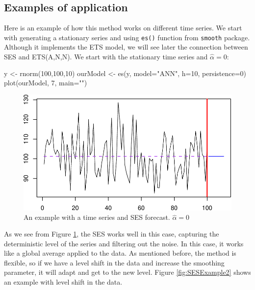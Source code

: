 \documentclass[
]{book}
\newenvironment{Shaded}{\begin{snugshade}}{\end{snugshade}}
\newcommand{\AttributeTok}[1]{\textcolor[rgb]{0.77,0.63,0.00}{#1}}
\newcommand{\DecValTok}[1]{\textcolor[rgb]{0.00,0.00,0.81}{#1}}
\newcommand{\FunctionTok}[1]{\textcolor[rgb]{0.00,0.00,0.00}{#1}}
\newcommand{\NormalTok}[1]{#1}
\newcommand{\OtherTok}[1]{\textcolor[rgb]{0.56,0.35,0.01}{#1}}
\newcommand{\StringTok}[1]{\textcolor[rgb]{0.31,0.60,0.02}{#1}}
\theoremstyle{definition}
\theoremstyle{definition}
\theoremstyle{definition}
\theoremstyle{definition}
\theoremstyle{remark}
\begin{document}
\hypertarget{examples-of-application}{%
\subsection{Examples of application}\label{examples-of-application}}

Here is an example of how this method works on different time series. We start with generating a stationary series and using \texttt{es()} function from \texttt{smooth} package. Although it implements the ETS model, we will see later the connection between SES and ETS(A,N,N). We start with the stationary time series and \(\hat{\alpha}=0\):

\begin{Shaded}
\begin{Highlighting}[]
\NormalTok{y }\OtherTok{\textless{}{-}} \FunctionTok{rnorm}\NormalTok{(}\DecValTok{100}\NormalTok{,}\DecValTok{100}\NormalTok{,}\DecValTok{10}\NormalTok{)}
\NormalTok{ourModel }\OtherTok{\textless{}{-}} \FunctionTok{es}\NormalTok{(y, }\AttributeTok{model=}\StringTok{"ANN"}\NormalTok{, }\AttributeTok{h=}\DecValTok{10}\NormalTok{, }\AttributeTok{persistence=}\DecValTok{0}\NormalTok{)}
\FunctionTok{plot}\NormalTok{(ourModel, }\DecValTok{7}\NormalTok{, }\AttributeTok{main=}\StringTok{""}\NormalTok{)}
\end{Highlighting}
\end{Shaded}

\begin{figure}
\centering
\includegraphics{adam_files/figure-latex/SESExample1-1.pdf}
\caption{\label{fig:SESExample1}An example with a time series and SES forecast. \(\hat{\alpha}=0\)}
\end{figure}

As we see from Figure \ref{fig:SESExample1}, the SES works well in this case, capturing the deterministic level of the series and filtering out the noise. In this case, it works like a global average applied to the data. As mentioned before, the method is flexible, so if we have a level shift in the data and increase the smoothing parameter, it will adapt and get to the new level. Figure \ref{fig:SESExample2} shows an example with level shift in the data.
\end{document}
